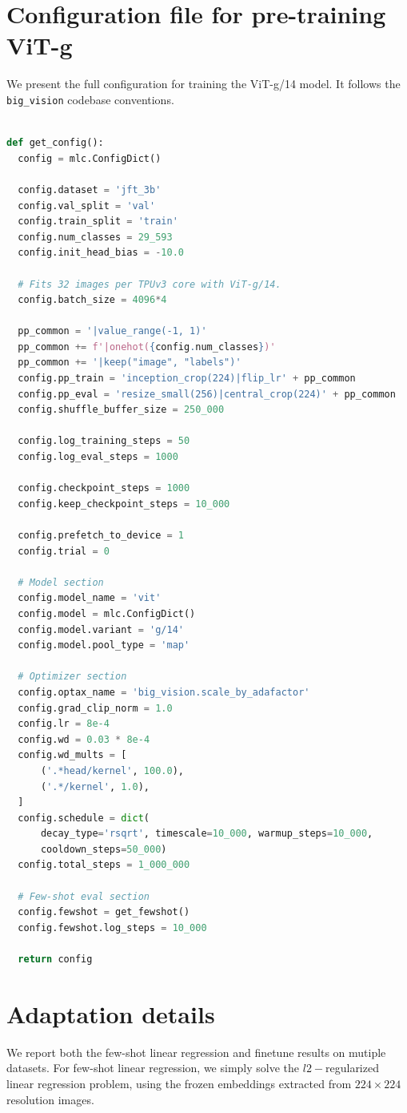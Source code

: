 \section{Configuration file for pre-training ViT-g}\label{app:configs}

We present the full configuration for training the ViT-g/14 model. It follows the \texttt{big\_vision} codebase\cite{big_vision} conventions.

\begin{lstlisting}[language=Python, caption=Full config for ViT-g/14 pre-training.]

def get_config():
  config = mlc.ConfigDict()

  config.dataset = 'jft_3b'
  config.val_split = 'val'
  config.train_split = 'train'
  config.num_classes = 29_593
  config.init_head_bias = -10.0

  # Fits 32 images per TPUv3 core with ViT-g/14.
  config.batch_size = 4096*4

  pp_common = '|value_range(-1, 1)'
  pp_common += f'|onehot({config.num_classes})'
  pp_common += '|keep("image", "labels")'
  config.pp_train = 'inception_crop(224)|flip_lr' + pp_common
  config.pp_eval = 'resize_small(256)|central_crop(224)' + pp_common
  config.shuffle_buffer_size = 250_000

  config.log_training_steps = 50
  config.log_eval_steps = 1000

  config.checkpoint_steps = 1000
  config.keep_checkpoint_steps = 10_000

  config.prefetch_to_device = 1
  config.trial = 0

  # Model section
  config.model_name = 'vit'
  config.model = mlc.ConfigDict()
  config.model.variant = 'g/14'
  config.model.pool_type = 'map'

  # Optimizer section
  config.optax_name = 'big_vision.scale_by_adafactor'
  config.grad_clip_norm = 1.0
  config.lr = 8e-4
  config.wd = 0.03 * 8e-4
  config.wd_mults = [
      ('.*head/kernel', 100.0),
      ('.*/kernel', 1.0),
  ]
  config.schedule = dict(
      decay_type='rsqrt', timescale=10_000, warmup_steps=10_000,
      cooldown_steps=50_000)
  config.total_steps = 1_000_000

  # Few-shot eval section
  config.fewshot = get_fewshot()
  config.fewshot.log_steps = 10_000

  return config

\end{lstlisting}


\section{Adaptation details}\label{sec:app:adaptation_details}
We report both the few-shot linear regression and finetune results on mutiple datasets.
For few-shot linear regression, we simply solve the $l2-$regularized linear regression problem, using the frozen embeddings extracted from $224\times224$ resolution images.

